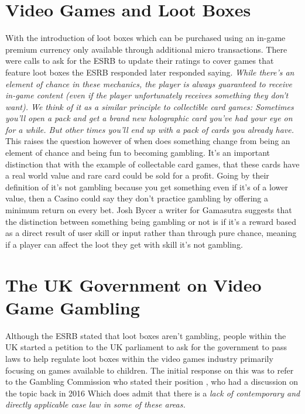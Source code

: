 \documentclass{scrartcl}
\begin{document}
\section{Video Games and Loot Boxes}

With the introduction of loot boxes which can be purchased using an in-game premium currency only available through additional micro transactions. There were calls to ask for the ESRB to update their ratings to cover games that feature loot boxes the ESRB responded later responded saying. \newline \newline \textit{While there's an element of chance in these mechanics, the player is always guaranteed to receive in-game content (even if the player unfortunately receives something they don’t want). We think of it as a similar principle to collectible card games: Sometimes you’ll open a pack and get a brand new holographic card you’ve had your eye on for a while. But other times you’ll end up with a pack of cards you already have.} \cite{Jason2017ESRB} \newline \newline This raises the question however of when does something change from being an element of chance and being fun to becoming gambling. It's an important distinction that with the example of collectable card games, that these cards have a real world value and rare card could be sold for a profit. Going by their definition of it's not gambling because you get something even if it's of a lower value, then a Casino could say they don't practice gambling by offering a minimum return on every bet. Josh Bycer a writer for Gamasutra \cite{Josh2017Loot} suggests that the distinction between something being gambling or not is if it's a reward based as a direct result of user skill or input rather than through pure chance, meaning if a player can affect the loot they get with skill it's not gambling.

\section{The UK Government on Video Game Gambling}
Although the ESRB stated that loot boxes aren't gambling, people within the UK started a petition to the UK parliament to ask for the government to pass laws to help regulate loot boxes within the video games industry primarily focusing on games available to children. The initial response on this was to refer to the Gambling Commission who stated their position \cite{GamCom2017position}, who had a discussion on the topic back in 2016 \cite{GamCom2016discussion} Which does admit that there is a \newline \newline \textit {lack of contemporary and directly applicable case law in some of these areas.} \newline \newline
\end{document}
